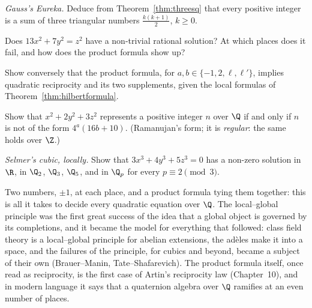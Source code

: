 \begin{exercise}[$\star\star$]\label{ex:eureka}
\emph{Gauss's Eureka.} Deduce from Theorem~\ref{thm:threesq} that every positive integer is a sum of three triangular numbers
$\frac{k(k+1)}2$, $k\ge0$.
\end{exercise}

\begin{exercise}[$\star\star$]\label{ex:legendre13}
Does $13x^2+7y^2=z^2$ have a non-trivial rational solution? At which places does it fail, and how does the product formula show
up?
\end{exercise}

\begin{exercise}[$\star\star$]\label{ex:prodQR}
Show conversely that the product formula, for $a,b\in\{-1,2,\ell,\ell'\}$, implies quadratic reciprocity and its two supplements,
given the local formulas of Theorem~\ref{thm:hilbertformula}.
\end{exercise}

\begin{exercise}[$\star\star$]\label{ex:x2y3z}
Show that $x^2+2y^2+3z^2$ represents a positive integer $n$ over $\Q$ if and only if $n$ is not of the form $4^a(16b+10)$.
(Ramanujan's form; it is \emph{regular}: the same holds over $\Z$.)
\end{exercise}

\begin{exercise}[$\star\star\star$]\label{ex:selmer}
\emph{Selmer's cubic, locally.} Show that $3x^3+4y^3+5z^3=0$ has a non-zero solution in $\R$, in $\Q_2$, $\Q_3$, $\Q_5$, and in $\Q_p$
for every $p\equiv2\pmod3$.
\end{exercise}

\begin{beauty}
Two numbers, $\pm1$, at each place, and a product formula tying them together: this is all it takes to decide every quadratic
equation over $\Q$. The local--global principle was the first great success of the idea that a global object is governed by
its completions, and it became the model for everything that followed: class field theory is a local--global principle for
abelian extensions, the ad\`eles make it into a space, and the failures of the principle, for cubics and beyond, became a
subject of their own (Brauer--Manin, Tate--Shafarevich). The product formula itself, once read as reciprocity, is the first
case of Artin's reciprocity law (Chapter~10), and in modern language it says that a quaternion algebra over $\Q$ ramifies at an
even number of places.
\end{beauty}

